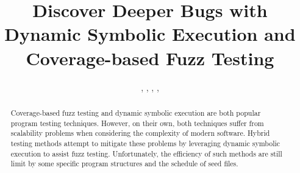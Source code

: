 \documentclass{cta-author}
\begin{document}

\title{Discover Deeper Bugs with Dynamic Symbolic Execution and Coverage-based Fuzz Testing}

\author{, , , ,  }
%
\address{
}

\begin{abstract}
%
%
Coverage-based fuzz testing and dynamic symbolic execution are both popular program testing techniques. However, on their own, both techniques suffer from scalability problems when considering the complexity of modern software. Hybrid testing methods attempt to mitigate these problems by leveraging dynamic symbolic execution to assist fuzz testing. Unfortunately, the efficiency of such methods are still limit by some specific program structures and the schedule of seed files.


\end{abstract}
\end{document}
